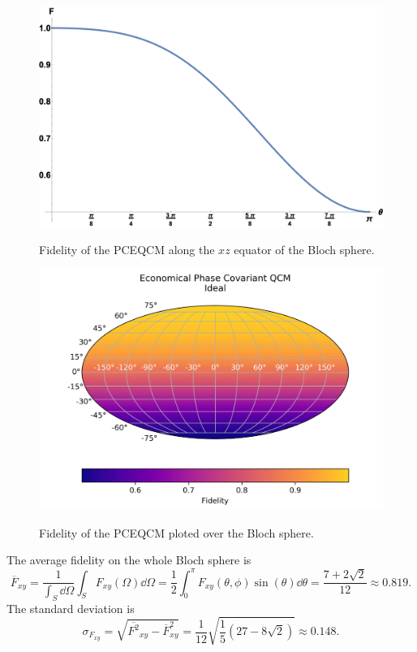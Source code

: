 \begin{figure}[H]
    \begin{minipage}{.5\textwidth}
        \centering
        \includegraphics[width=\textwidth]{Figures/plot_1D_economical_phase_covariant.png}
        \label{fig:economical_phase_covariant_rotated_1d}
        \caption{Fidelity of the PCEQCM along the $xz$ equator of the Bloch sphere.}
      \end{minipage}%
      \begin{minipage}{.5\textwidth}
        \centering
        \includegraphics[width=\textwidth]{Figures/economical_phase_covariant_rotated.png}
        \label{fig:economical_phase_covariant_rotated}
        \caption{Fidelity of the PCEQCM ploted over the Bloch sphere.}
      \end{minipage}
    \end{figure}
The average fidelity on the whole Bloch sphere is
\begin{equation}
    \overline{F}_{xy}=\frac{1}{\int_S \dd{\Omega}}\int_S F_{xy}(\Omega)\dd{\Omega}=\frac{1}{2}\int_0^\pi F_{xy}(\theta,\phi)\sin(\theta)\dd{\theta}=\frac{7+2\sqrt{2}}{12}\approx 0.819.
    \label{eqn:avg_fidelity_epcqcm}
\end{equation}
The standard deviation is
\begin{equation}
    \sigma_{{F}_{xy}}=\sqrt{\overline{F^2}_{xy}-\overline{F}^2_{xy}}
    =\frac{1}{12} \sqrt{\frac{1}{5} \left(27-8 \sqrt{2}\right)}\approx 0.148.
    \label{eqn:std_fidelity_epcqcm}
\end{equation}

